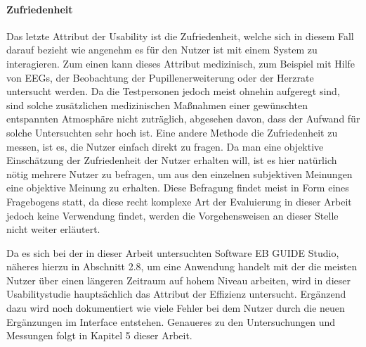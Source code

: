 \paragraph{Zufriedenheit}
Das letzte Attribut der Usability ist die Zufriedenheit, welche sich in diesem Fall darauf bezieht wie angenehm es für den Nutzer ist mit einem System zu interagieren.
Zum einen kann dieses Attribut medizinisch, zum Beispiel mit Hilfe von EEGs, der Beobachtung der Pupillenerweiterung oder der Herzrate untersucht werden.
Da die Testpersonen jedoch meist ohnehin aufgeregt sind, sind solche zusätzlichen medizinischen Maßnahmen einer gewünschten entspannten Atmosphäre nicht zuträglich, abgesehen davon, dass der Aufwand für solche Untersuchten sehr hoch ist.
Eine andere Methode die Zufriedenheit zu messen, ist es, die Nutzer einfach direkt zu fragen.
Da man eine objektive Einschätzung der Zufriedenheit der Nutzer erhalten will, ist es hier natürlich nötig mehrere Nutzer zu befragen, um aus den einzelnen subjektiven Meinungen eine objektive Meinung zu erhalten.
Diese Befragung findet meist in Form eines Fragebogens statt, da diese recht komplexe Art der Evaluierung in dieser Arbeit jedoch keine Verwendung findet, werden die Vorgehensweisen an dieser Stelle nicht weiter erläutert.

Da es sich bei der in dieser Arbeit untersuchten Software EB GUIDE Studio, näheres hierzu in Abschnitt 2.8, um eine Anwendung handelt mit der die meisten Nutzer über einen längeren Zeitraum auf hohem Niveau arbeiten, wird in dieser Usabilitystudie hauptsächlich das Attribut der Effizienz untersucht. Ergänzend dazu wird noch dokumentiert wie viele Fehler bei dem Nutzer durch die neuen Ergänzungen im Interface entstehen. Genaueres zu den Untersuchungen und Messungen folgt in Kapitel 5 dieser Arbeit.


